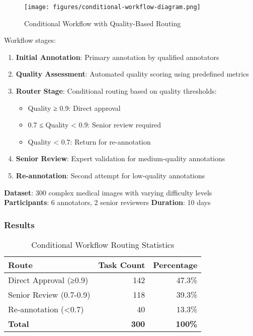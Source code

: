 \begin{figure}[htbp]
\centering
\texttt{[image: figures/conditional-workflow-diagram.png]}
\caption{Conditional Workflow with Quality-Based Routing}
\label{fig:conditional-workflow}
\end{figure}

Workflow stages:
\begin{enumerate}
    \item \textbf{Initial Annotation}: Primary annotation by qualified annotators
    \item \textbf{Quality Assessment}: Automated quality scoring using predefined metrics
    \item \textbf{Router Stage}: Conditional routing based on quality thresholds:
    \begin{itemize}
        \item Quality ≥ 0.9: Direct approval
        \item 0.7 ≤ Quality < 0.9: Senior review required
        \item Quality < 0.7: Return for re-annotation
    \end{itemize}
    \item \textbf{Senior Review}: Expert validation for medium-quality annotations
    \item \textbf{Re-annotation}: Second attempt for low-quality annotations
\end{enumerate}

\textbf{Dataset}: 300 complex medical images with varying difficulty levels
\textbf{Participants}: 6 annotators, 2 senior reviewers
\textbf{Duration}: 10 days

\subsubsection{Results}

\begin{table}[htbp]
\centering
\caption{Conditional Workflow Routing Statistics}
\label{tab:conditional-workflow-results}
\begin{tabular}{|l|r|r|}
\hline
\textbf{Route} & \textbf{Task Count} & \textbf{Percentage} \\
\hline
Direct Approval (≥0.9) & 142 & 47.3\% \\
Senior Review (0.7-0.9) & 118 & 39.3\% \\
Re-annotation (<0.7) & 40 & 13.3\% \\
\hline
\textbf{Total} & \textbf{300} & \textbf{100\%} \\
\hline
\end{tabular}
\end{table}

